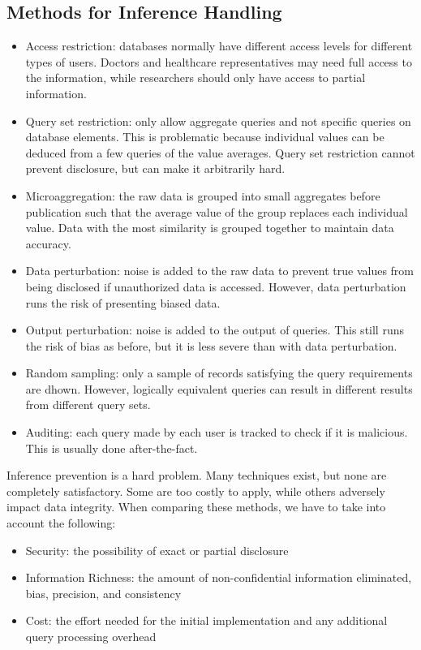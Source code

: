 \documentclass{math}
\begin{document}
\subsection*{Methods for Inference Handling}
\begin{itemize}
  \item Access restriction: databases normally have different access levels for
  different types of users. Doctors and healthcare representatives may need
  full access to the information, while researchers should only have access to
  partial information.
  \item Query set restriction: only allow aggregate queries and not specific
  queries on database elements. This is problematic because individual values
  can be deduced from a few queries of the value averages. Query set restriction
  cannot prevent disclosure, but can make it arbitrarily hard.
  \item Microaggregation: the raw data is grouped into small aggregates before
  publication such that the average value of the group replaces each individual
  value. Data with the most similarity is grouped together to maintain data
  accuracy.
  \item Data perturbation: noise is added to the raw data to prevent true values
  from being disclosed if unauthorized data is accessed. However, data
  perturbation runs the risk of presenting biased data.
  \item Output perturbation: noise is added to the output of queries. This still
  runs the risk of bias as before, but it is less severe than with data
  perturbation.
  \item Random sampling: only a sample of records satisfying the query
  requirements are dhown. However, logically equivalent queries can result in
  different results from different query sets.
  \item Auditing: each query made by each user is tracked to check if it is
  malicious. This is usually done after-the-fact.
\end{itemize}
Inference prevention is a hard problem. Many techniques exist, but none are
completely satisfactory. Some are too costly to apply, while others adversely
impact data integrity. When comparing these methods, we have to take into
account the following:
\begin{itemize}
  \item Security: the possibility of exact or partial disclosure
  \item Information Richness: the amount of non-confidential information
  eliminated, bias, precision, and consistency
  \item Cost: the effort needed for the initial implementation and any
  additional query processing overhead
\end{itemize}
\end{document}
